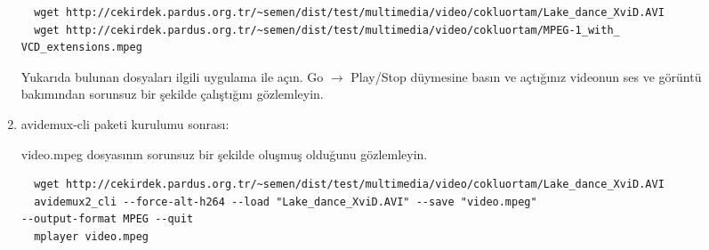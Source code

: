 \documentclass[a4paper,10pt]{article}
\begin{document}
\begin{enumerate}
\begin{verbatim}
  wget http://cekirdek.pardus.org.tr/~semen/dist/test/multimedia/video/cokluortam/Lake_dance_XviD.AVI
  wget http://cekirdek.pardus.org.tr/~semen/dist/test/multimedia/video/cokluortam/MPEG-1_with_
VCD_extensions.mpeg
\end{verbatim}
Yukarıda bulunan dosyaları ilgili uygulama ile açın. Go $\rightarrow$ Play/Stop düymesine basın ve açtığınız videonun ses ve görüntü bakımından sorunsuz bir şekilde çalıştığını gözlemleyin.
\item avidemux-cli paketi kurulumu sonrası:

video.mpeg dosyasının sorunsuz bir şekilde oluşmuş olduğunu gözlemleyin.
\begin{verbatim}
  wget http://cekirdek.pardus.org.tr/~semen/dist/test/multimedia/video/cokluortam/Lake_dance_XviD.AVI
  avidemux2_cli --force-alt-h264 --load "Lake_dance_XviD.AVI" --save "video.mpeg" 
--output-format MPEG --quit 
  mplayer video.mpeg
\end{verbatim}

\end{enumerate}
\end{document}
